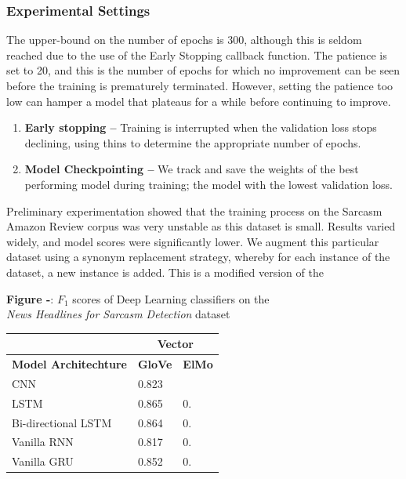 \documentclass[12pt,a4paper]{article}
\begin{document}
\subsubsection{Experimental Settings}
The upper-bound on the number of epochs is 300, although this is seldom reached due to the use of the Early Stopping callback function. The patience is set to 20, and this is the number of epochs for which no improvement can be seen before the training is prematurely terminated. However, setting the patience too low can hamper a model that plateaus for a while before continuing to improve.

\begin{enumerate}
	\item \textbf{Early stopping --} Training is interrupted when the validation loss stops declining, using thins to determine the appropriate number of epochs.
	\item \textbf{Model Checkpointing --} We track and save the weights of the best performing model during training; the model with the lowest validation loss.
\end{enumerate}

Preliminary experimentation showed that the training process on the Sarcasm Amazon Review corpus was very unstable as this dataset is small. Results varied widely, and model scores were significantly lower. We augment this particular dataset using a synonym replacement strategy, whereby for each instance of the dataset, a new instance is added. This is a modified version of the 


\begin{center}
	\textbf{Figure -}: $F_1$ scores of Deep Learning classifiers on the \\\textit{News Headlines for Sarcasm Detection} dataset
\end{center}

\begin{center}
	\begin{tabular}{|p{4.7cm}||p{1.2cm}|p{1.5cm}|}
		\hline
		& \multicolumn{2}{|c|}{\textbf{Vector}} \\
		\hline
		\textbf{Model Architechture}& \textbf{GloVe} & \textbf{ElMo}\\
		\hline\hline
		CNN   & 0.823   & \\
		LSTM &   0.865 & 0.\\
		Bi-directional LSTM & 0.864 & 0.\\
		Vanilla RNN &0.817 & 0.\\
		Vanilla GRU &0.852 & 0.\\
		\hline
	\end{tabular}
\end{center}
\end{document}
